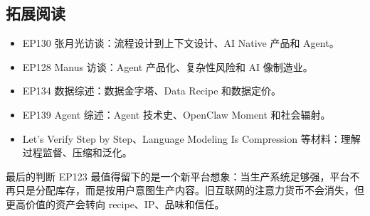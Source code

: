 \subsection{拓展阅读}

\begin{itemize}
\item EP130 张月光访谈：流程设计到上下文设计、AI Native 产品和 Agent。
\item EP128 Manus 访谈：Agent 产品化、复杂性风险和 AI 像制造业。
\item EP134 数据综述：数据金字塔、Data Recipe 和数据定价。
\item EP139 Agent 综述：Agent 技术史、OpenClaw Moment 和社会辐射。
\item Let's Verify Step by Step、Language Modeling Is Compression 等材料：理解过程监督、压缩和泛化。
\end{itemize}

\begin{importantbox}{最后的判断}
EP123 最值得留下的是一个新平台想象：当生产系统足够强，平台不再只是分配库存，而是按用户意图生产内容。旧互联网的注意力货币不会消失，但更高价值的资产会转向 recipe、IP、品味和信任。
\end{importantbox}


